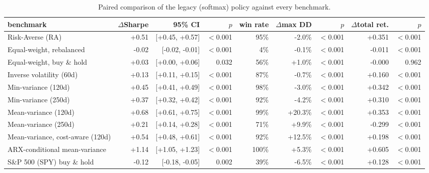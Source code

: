 \begin{table}[ht!]
\centering
\footnotesize
\setlength{\tabcolsep}{4pt}
\begin{tabular}{lrrrrrrrr}
\hline
benchmark & $\Delta$Sharpe & 95\% CI & $p$ & win rate & $\Delta$max DD & $p$ & $\Delta$total ret. & $p$ \\
\hline
Risk-Averse (RA) & +0.51 & [+0.45, +0.57] & $<$0.001 & 95\% & -2.0\% & $<$0.001 & +0.351 & $<$0.001 \\
Equal-weight, rebalanced & -0.02 & [-0.02, -0.01] & $<$0.001 & 4\% & -0.1\% & $<$0.001 & -0.011 & $<$0.001 \\
Equal-weight, buy \& hold & +0.03 & [+0.00, +0.06] & 0.032 & 56\% & +1.0\% & $<$0.001 & -0.000 & 0.962 \\
Inverse volatility (60d) & +0.13 & [+0.11, +0.15] & $<$0.001 & 87\% & -0.7\% & $<$0.001 & +0.160 & $<$0.001 \\
Min-variance (120d) & +0.45 & [+0.41, +0.49] & $<$0.001 & 98\% & -3.0\% & $<$0.001 & +0.342 & $<$0.001 \\
Min-variance (250d) & +0.37 & [+0.32, +0.42] & $<$0.001 & 92\% & -4.2\% & $<$0.001 & +0.310 & $<$0.001 \\
Mean-variance (120d) & +0.68 & [+0.61, +0.75] & $<$0.001 & 99\% & +20.3\% & $<$0.001 & +0.353 & $<$0.001 \\
Mean-variance (250d) & +0.21 & [+0.14, +0.28] & $<$0.001 & 71\% & +9.9\% & $<$0.001 & -0.299 & $<$0.001 \\
Mean-variance, cost-aware (120d) & +0.54 & [+0.48, +0.61] & $<$0.001 & 92\% & +12.5\% & $<$0.001 & +0.198 & $<$0.001 \\
ARX-conditional mean-variance & +1.14 & [+1.05, +1.23] & $<$0.001 & 100\% & +5.3\% & $<$0.001 & +0.605 & $<$0.001 \\
S\&P 500 (SPY) buy \& hold & -0.12 & [-0.18, -0.05] & 0.002 & 39\% & -6.5\% & $<$0.001 & +0.128 & $<$0.001 \\
\hline
\end{tabular}
\caption{Paired comparison of the legacy (softmax) policy against every benchmark.}
\label{tab:bench_paired_softmax_oos2026}
\end{table}
